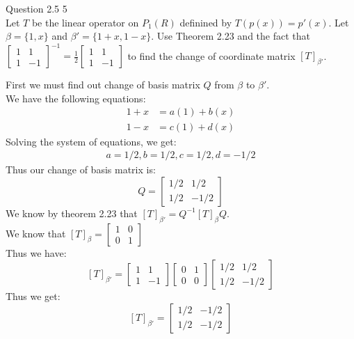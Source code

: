 \documentclass[answers,12pt,addpoints]{exam}
\begin{document}
\begin{questions}
    \question Question 2.5 5\\
    Let $T$ be the linear operator on $P_1(R)$ definined by $T(p(x)) = p'(x)$. Let $\beta = \{1, x\}$ and $\beta' = \{1+x , 1-x\}$. Use Theorem 2.23 and the fact that $\begin{bmatrix}
        1 & 1\\
        1 & -1
    \end{bmatrix}^{-1} = \frac{1}{2}\begin{bmatrix}
        1 & 1\\
        1 & -1
    \end{bmatrix}$ to find the change of coordinate matrix $[T]_{\beta'}$.
    \begin{solution}
        First we must find out change of basis matrix $Q$ from $\beta$ to $\beta'$.\\
        We have the following equations:
        \begin{align*}
            1+x &= a(1) + b(x)\\
            1-x &= c(1) + d(x)
        \end{align*}
        Solving the system of equations, we get:
        \begin{align*}
            a = 1/2, b = 1/2, c = 1/2, d = -1/2
        \end{align*}
        Thus our change of basis matrix is:
        $$Q = \begin{bmatrix}
            1/2 & 1/2\\
            1/2 & -1/2
        \end{bmatrix}$$
        We know by theorem 2.23 that $[T]_{\beta'} = Q^{-1} [T]_{\beta} Q$.\\
        We know that $[T]_{\beta} = \begin{bmatrix}
           1 & 0\\
            0 & 1
        \end{bmatrix}$\\
        Thus we have:
        $$ [T]_{\beta'} = \begin{bmatrix}
            1 & 1\\
            1 & -1
        \end{bmatrix} \begin{bmatrix}
            0 & 1\\
            0 & 0
        \end{bmatrix} \begin{bmatrix}
            1/2 & 1/2\\
            1/2 & -1/2
        \end{bmatrix}$$
        Thus we get:
        $$ [T]_{\beta'} = \begin{bmatrix}
            1/2 & -1/2\\
            1/2 & -1/2
        \end{bmatrix}$$
    \end{solution}
    

\end{questions}
\end{document}
